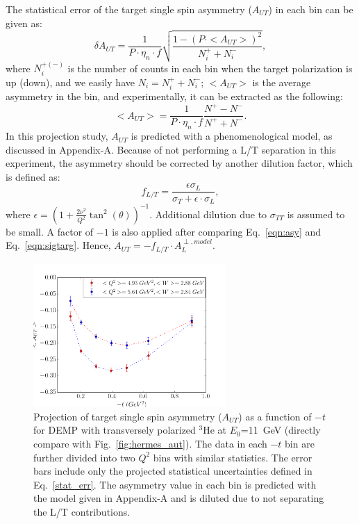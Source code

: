 The statistical error of the target single spin asymmetry ($A_{UT}$) in each
bin can be given as:
  \begin{equation}
    \delta A_{UT} = \frac{1}{P\cdot\eta_{n}\cdot f} \sqrt{\frac{1-(P\cdot
        <A_{UT}>)^{2}}{N^{+}_{i}+N^{-}_{i}}},
    \label{stat_err}
 \end{equation}
where $N^{+(-)}_{i}$ is the number of counts in each bin when the target
polarization is up (down), and we easily have $N_{i}=N^{+}_{i}+N^{-}_{i}$;
$<A_{UT}>$ is the average asymmetry in the bin, and experimentally, it can be
extracted as the following:
\begin{equation}
   <A_{UT}> = \frac{1}{P\cdot\eta_{n}\cdot f} \frac{N^{+}-N^{-}}{N^{+}+N^{-}}.
   \label{asym_exp}
\end{equation}
In this projection study, $A_{UT}$ is predicted with a phenomenological model,
as discussed in Appendix-A. Because of not performing a L/T separation in this
experiment, the asymmetry should be corrected by another dilution factor, which
is defined as:
\begin{equation}
  f_{L/T} =\frac{\epsilon\sigma_{L} }{\sigma_{T}+\epsilon\cdot\sigma_{L} },
\end{equation} 
where $\epsilon=(1+\frac{2\nu^{2}}{Q^{2}}\tan^{2}(\theta))^{-1}$. Additional
dilution due to $\sigma_{TT}$ is assumed to be small.  A factor of $-1$ is also
applied after comparing Eq.~\ref{eqn:asy} and Eq.~\ref{eqn:sigtarg}. Hence,
$A_{UT} = -f_{L/T}\cdot A_{L}^{\perp,model}$.

\begin{figure}[!ht]
 \begin{center}
               \includegraphics[type=pdf,
        ext=.pdf,read=.pdf,width=0.65\textwidth]{./figures/bin_asym_t_fermi_023Hz} 
      
      \caption{\footnotesize{Projection of target single spin asymmetry
          ($A_{UT}$) as a function of $-t$ for DEMP with transversely polarized
$\mathrm{^{3}He}$ at $E_{0}$=11~GeV (directly compare with
Fig.~\ref{fig:hermes_aut}).  The data in each $-t$ bin are further divided into
two $Q^{2}$ bins with similar statistics.  The error bars include only the
projected statistical uncertainties defined in Eq.~\ref{stat_err}. The
asymmetry value in each bin is predicted with the model given in Appendix-A and
is diluted due to not separating the L/T contributions.}}
  \label{asym_t}
  \end{center}
\end{figure}


